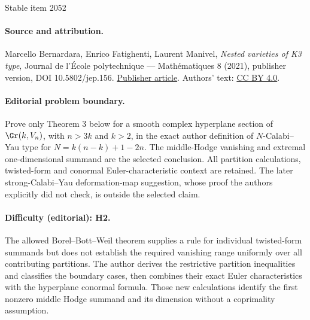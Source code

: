 \documentclass[11pt]{article}
\begin{document}
\begin{center}{\Large Stable item 2052}\end{center}
\paragraph{Source and attribution.}
Marcello Bernardara, Enrico Fatighenti, Laurent Manivel, \emph{Nested varieties of K3 type}, Journal de l’École polytechnique — Mathématiques 8 (2021), publisher version, DOI 10.5802/jep.156. \href{https://jep.centre-mersenne.org/articles/10.5802/jep.156/}{Publisher article}. Authors' text: \href{https://creativecommons.org/licenses/by/4.0/}{CC BY 4.0}.
\paragraph{Editorial problem boundary.}
Prove only Theorem 3 below for a smooth complex hyperplane section of \(\Gr(k,V_n)\), with \(n>3k\) and \(k>2\), in the exact author definition of \(N\)-Calabi--Yau type for \(N=k(n-k)+1-2n\). The middle-Hodge vanishing and extremal one-dimensional summand are the selected conclusion. All partition calculations, twisted-form and conormal Euler-characteristic context are retained. The later strong-Calabi--Yau deformation-map suggestion, whose proof the authors explicitly did not check, is outside the selected claim.
\paragraph{Difficulty (editorial): H2.}
The allowed Borel--Bott--Weil theorem supplies a rule for individual twisted-form summands but does not establish the required vanishing range uniformly over all contributing partitions. The author derives the restrictive partition inequalities and classifies the boundary cases, then combines their exact Euler characteristics with the hyperplane conormal formula. Those new calculations identify the first nonzero middle Hodge summand and its dimension without a coprimality assumption.
\end{document}
